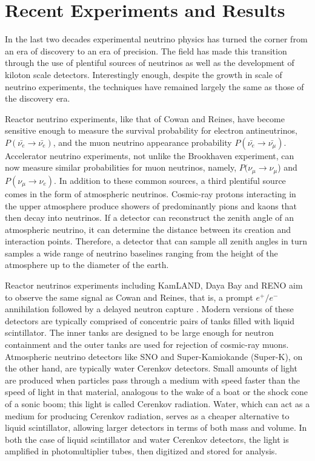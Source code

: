 \section{Recent Experiments and Results}
In the last two decades experimental neutrino physics has turned the corner from an era of discovery to an era of precision.  The field has made this transition through the use of plentiful sources of neutrinos as well as the development of kiloton scale detectors.  Interestingly enough, despite the growth in scale of neutrino experiments, the techniques have remained largely the same as those of the discovery era.  

Reactor neutrino experiments, like that of Cowan and Reines, have become sensitive enough to measure the survival probability for electron antineutrinos, $P(\bar{\nu_e} \rightarrow \bar{\nu_e})$, and the muon neutrino appearance probability $P(\bar{\nu_e} \rightarrow \bar{\nu_\mu})$.  Accelerator neutrino experiments, not unlike the Brookhaven experiment, can now measure similar probabilities for muon neutrinos, namely, $P(\nu_\mu \rightarrow \nu_\mu$) and $P(\nu_\mu \rightarrow \nu_e)$.  In addition to these common sources, a third plentiful source comes in the form of atmospheric neutrinos.  Cosmic-ray protons interacting in the upper atmosphere produce showers of predominantly pions and kaons that then decay into neutrinos.  If a detector can reconstruct the zenith angle of an atmospheric neutrino, it can determine the distance between its creation and interaction points.  Therefore, a detector that can sample all zenith angles in turn samples a wide range of neutrino baselines ranging from the height of the atmosphere up to the diameter of the earth.  

Reactor neutrinos experiments including KamLAND, Daya Bay and RENO aim to observe the same signal as Cowan and Reines, that is, a prompt $e^+/e^-$ annihilation followed by a delayed neutron capture \cite{kamland, dayaBay, reno}.  Modern versions of these detectors are typically comprised of concentric pairs of tanks filled with liquid scintillator.  The inner tanks are designed to be large enough for neutron containment and the outer tanks are used for rejection of cosmic-ray muons.   Atmospheric neutrino detectors like SNO and Super-Kamiokande (Super-K), on the other hand, are typically water Cerenkov detectors.  Small amounts of light are produced when particles pass through a medium with speed faster than the speed of light in that material, analogous to the wake of a boat or the shock cone of a sonic boom; this light is called Cerenkov radiation.  Water, which can act as a medium for producing Cerenkov radiation, serves as a cheaper alternative to liquid scintillator, allowing larger detectors in terms of both mass and volume.  In both the case of liquid scintillator and water Cerenkov detectors, the light is amplified in photomultiplier tubes, then digitized and stored for analysis.  

